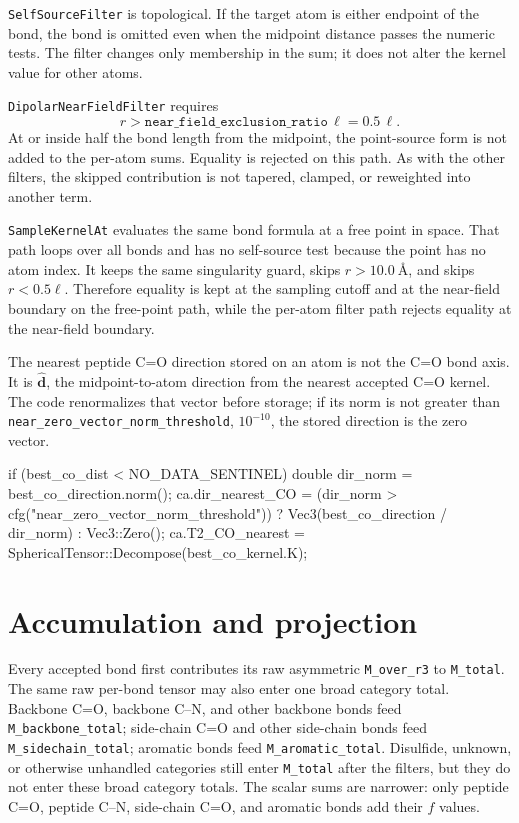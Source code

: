 \documentclass[11pt]{article}
\newcommand{\code}[1]{\texttt{#1}}
\begin{document}
\code{SelfSourceFilter} is topological. If the target atom is either endpoint
of the bond, the bond is omitted even when the midpoint distance passes the
numeric tests. The filter changes only membership in the sum; it does not alter
the kernel value for other atoms.

\code{DipolarNearFieldFilter} requires
\[
  r >
  \code{near\_field\_exclusion\_ratio}\,\ell
  = 0.5\,\ell .
\]
At or inside half the bond length from the midpoint, the point-source form is
not added to the per-atom sums. Equality is rejected on this path. As with the
other filters, the skipped contribution is not tapered, clamped, or reweighted
into another term.

\code{SampleKernelAt} evaluates the same bond formula at a free point in
space. That path loops over all bonds and has no self-source test because the
point has no atom index. It keeps the same singularity guard, skips
\(r>\SI{10.0}{\angstrom}\), and skips \(r<0.5\ell\). Therefore equality is kept
at the sampling cutoff and at the near-field boundary on the free-point path,
while the per-atom filter path rejects equality at the near-field boundary.

The nearest peptide C=O direction stored on an atom is not the C=O bond axis.
It is \(\hat{\bm d}\), the midpoint-to-atom direction from the nearest accepted
C=O kernel. The code renormalizes that vector before storage; if its norm is
not greater than \code{near\_zero\_vector\_norm\_threshold}, \(10^{-10}\), the
stored direction is the zero vector.

\begin{codebox}
if (best_co_dist < NO_DATA_SENTINEL) {
    double dir_norm = best_co_direction.norm();
    ca.dir_nearest_CO =
        (dir_norm > cfg("near_zero_vector_norm_threshold"))
            ? Vec3(best_co_direction / dir_norm)
            : Vec3::Zero();
    ca.T2_CO_nearest = SphericalTensor::Decompose(best_co_kernel.K);
}
\end{codebox}

\section{Accumulation and projection}

Every accepted bond first contributes its raw asymmetric
\code{M\_over\_r3} to \code{M\_total}. The same raw per-bond tensor may also
enter one broad category total. Backbone C=O, backbone C--N, and other
backbone bonds feed \code{M\_backbone\_total}; side-chain C=O and other
side-chain bonds feed \code{M\_sidechain\_total}; aromatic bonds feed
\code{M\_aromatic\_total}. Disulfide, unknown, or otherwise unhandled
categories still enter \code{M\_total} after the filters, but they do not enter
these broad category totals. The scalar sums are narrower: only peptide C=O,
peptide C--N, side-chain C=O, and aromatic bonds add their \(f\) values.
\end{document}
